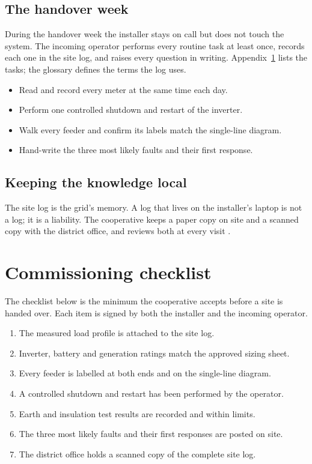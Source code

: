 \subsection{The handover week}

During the handover week the installer stays on call but does not touch the system.
The incoming operator performs every routine task at least once, records each one in
the site log, and raises every question in writing. Appendix~\ref{app:checklist} lists
the tasks; the glossary defines the terms the log uses.

\begin{itemize}
\item Read and record every meter at the same time each day.
\item Perform one controlled shutdown and restart of the inverter.
\item Walk every feeder and confirm its labels match the single-line diagram.
\item Hand-write the three most likely faults and their first response.
\end{itemize}

\subsection{Keeping the knowledge local}

The site log is the grid's memory. A log that lives on the installer's laptop is not a
log; it is a liability. The cooperative keeps a paper copy on site and a scanned copy
with the district office, and reviews both at every visit \cite{valley-survey}.

\bookappendix

\section{Commissioning checklist}
\label{app:checklist}

The checklist below is the minimum the cooperative accepts before a site is handed
over. Each item is signed by both the installer and the incoming operator.

\begin{enumerate}
\item The measured load profile is attached to the site log.
\item Inverter, battery and generation ratings match the approved sizing sheet.
\item Every feeder is labelled at both ends and on the single-line diagram.
\item A controlled shutdown and restart has been performed by the operator.
\item Earth and insulation test results are recorded and within limits.
\item The three most likely faults and their first responses are posted on site.
\item The district office holds a scanned copy of the complete site log.
\end{enumerate}

